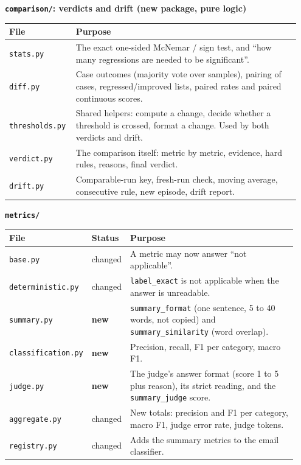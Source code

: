 \documentclass[11pt,a4paper]{article}
\newcommand{\code}[1]{\nolinkurl{#1}}
\newcommand{\new}{\textbf{new}}
\begin{document}
\textbf{\code{comparison/}: verdicts and drift (new package, pure logic)}

\begin{longtable}{@{}p{0.20\linewidth}p{0.75\linewidth}@{}}
\toprule
\textbf{File} & \textbf{Purpose} \\
\midrule
\endhead
\code{stats.py} & The exact one-sided McNemar / sign test, and ``how many regressions are needed to be significant''. \\
\code{diff.py} & Case outcomes (majority vote over samples), pairing of cases, regressed/improved lists, paired rates and paired continuous scores. \\
\code{thresholds.py} & Shared helpers: compute a change, decide whether a threshold is crossed, format a change. Used by both verdicts and drift. \\
\code{verdict.py} & The comparison itself: metric by metric, evidence, hard rules, reasons, final verdict. \\
\code{drift.py} & Comparable-run key, fresh-run check, moving average, consecutive rule, new episode, drift report. \\
\bottomrule
\end{longtable}

\textbf{\code{metrics/}}

\begin{longtable}{@{}p{0.20\linewidth}p{0.09\linewidth}p{0.65\linewidth}@{}}
\toprule
\textbf{File} & \textbf{Status} & \textbf{Purpose} \\
\midrule
\endhead
\code{base.py} & changed & A metric may now answer ``not applicable''. \\
\code{deterministic.py} & changed & \code{label_exact} is not applicable when the answer is unreadable. \\
\code{summary.py} & \new & \code{summary_format} (one sentence, 5 to 40 words, not copied) and \code{summary_similarity} (word overlap). \\
\code{classification.py} & \new & Precision, recall, F1 per category, macro F1. \\
\code{judge.py} & \new & The judge's answer format (score 1 to 5 plus reason), its strict reading, and the \code{summary_judge} score. \\
\code{aggregate.py} & changed & New totals: precision and F1 per category, macro F1, judge error rate, judge tokens. \\
\code{registry.py} & changed & Adds the summary metrics to the email classifier. \\
\bottomrule
\end{longtable}
\end{document}
